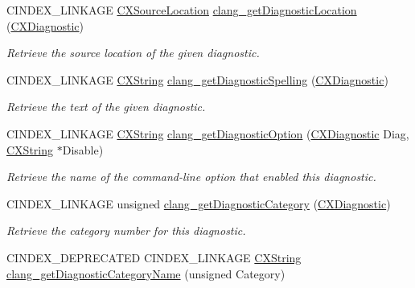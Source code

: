 \begin{DoxyCompactItemize}
C\+I\+N\+D\+E\+X\+\_\+\+L\+I\+N\+K\+A\+GE \mbox{\hyperlink{structCXSourceLocation}{C\+X\+Source\+Location}} \mbox{\hyperlink{group__CINDEX__DIAG_gabfcf70ac15bb3e5ae39ef2c5e07c7428}{clang\+\_\+get\+Diagnostic\+Location}} (\mbox{\hyperlink{group__CINDEX__DIAG_ga44bb8aba7c40590ad25d1763c4fbff7f}{C\+X\+Diagnostic}})
\begin{DoxyCompactList}\small\item\em Retrieve the source location of the given diagnostic. \end{DoxyCompactList}\item 
\mbox{\label{group__CINDEX__DIAG_ga34a875e6d06ed4f8d2fc032f850ebbe1}} 
C\+I\+N\+D\+E\+X\+\_\+\+L\+I\+N\+K\+A\+GE \mbox{\hyperlink{structCXString}{C\+X\+String}} \mbox{\hyperlink{group__CINDEX__DIAG_ga34a875e6d06ed4f8d2fc032f850ebbe1}{clang\+\_\+get\+Diagnostic\+Spelling}} (\mbox{\hyperlink{group__CINDEX__DIAG_ga44bb8aba7c40590ad25d1763c4fbff7f}{C\+X\+Diagnostic}})
\begin{DoxyCompactList}\small\item\em Retrieve the text of the given diagnostic. \end{DoxyCompactList}\item 
C\+I\+N\+D\+E\+X\+\_\+\+L\+I\+N\+K\+A\+GE \mbox{\hyperlink{structCXString}{C\+X\+String}} \mbox{\hyperlink{group__CINDEX__DIAG_ga69b094e2cca1cd6f452327dc9204a168}{clang\+\_\+get\+Diagnostic\+Option}} (\mbox{\hyperlink{group__CINDEX__DIAG_ga44bb8aba7c40590ad25d1763c4fbff7f}{C\+X\+Diagnostic}} Diag, \mbox{\hyperlink{structCXString}{C\+X\+String}} $\ast$Disable)
\begin{DoxyCompactList}\small\item\em Retrieve the name of the command-\/line option that enabled this diagnostic. \end{DoxyCompactList}\item 
C\+I\+N\+D\+E\+X\+\_\+\+L\+I\+N\+K\+A\+GE unsigned \mbox{\hyperlink{group__CINDEX__DIAG_ga0ec085bd59b8b6c935eab0e53a1f348f}{clang\+\_\+get\+Diagnostic\+Category}} (\mbox{\hyperlink{group__CINDEX__DIAG_ga44bb8aba7c40590ad25d1763c4fbff7f}{C\+X\+Diagnostic}})
\begin{DoxyCompactList}\small\item\em Retrieve the category number for this diagnostic. \end{DoxyCompactList}\item 
C\+I\+N\+D\+E\+X\+\_\+\+D\+E\+P\+R\+E\+C\+A\+T\+ED C\+I\+N\+D\+E\+X\+\_\+\+L\+I\+N\+K\+A\+GE \mbox{\hyperlink{structCXString}{C\+X\+String}} \mbox{\hyperlink{group__CINDEX__DIAG_gaf3d608c7860a57ce6571a3b03b4ead33}{clang\+\_\+get\+Diagnostic\+Category\+Name}} (unsigned Category)

\end{DoxyCompactItemize}
